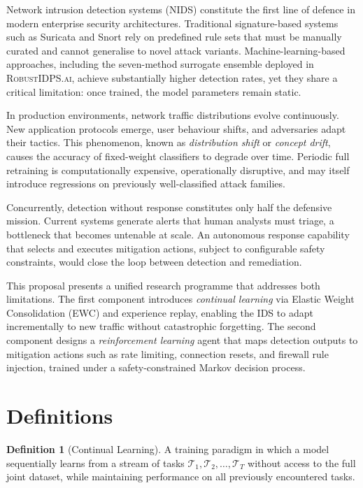 \documentclass[12pt,a4paper]{article}
\newcommand{\RobustIDPS}{\textsc{RobustIDPS.ai}}
\newcommand{\EWC}{\textsc{EWC}}
\theoremstyle{definition}
\newtheorem{definition}{Definition}[section]
\begin{document}
Network intrusion detection systems (NIDS) constitute the first line of defence in modern enterprise security architectures.
Traditional signature-based systems such as Suricata and Snort rely on predefined rule sets that must be manually curated and cannot generalise to novel attack variants.
Machine-learning-based approaches, including the seven-method surrogate ensemble deployed in \RobustIDPS{}, achieve substantially higher detection rates, yet they share a critical limitation: once trained, the model parameters remain static.

In production environments, network traffic distributions evolve continuously.
New application protocols emerge, user behaviour shifts, and adversaries adapt their tactics.
This phenomenon, known as \emph{distribution shift} or \emph{concept drift}, causes the accuracy of fixed-weight classifiers to degrade over time.
Periodic full retraining is computationally expensive, operationally disruptive, and may itself introduce regressions on previously well-classified attack families.

Concurrently, detection without response constitutes only half the defensive mission.
Current systems generate alerts that human analysts must triage, a bottleneck that becomes untenable at scale.
An autonomous response capability that selects and executes mitigation actions, subject to configurable safety constraints, would close the loop between detection and remediation.

This proposal presents a unified research programme that addresses both limitations.
The first component introduces \emph{continual learning} via Elastic Weight Consolidation (\EWC{}) and experience replay, enabling the IDS to adapt incrementally to new traffic without catastrophic forgetting.
The second component designs a \emph{reinforcement learning} agent that maps detection outputs to mitigation actions such as rate limiting, connection resets, and firewall rule injection, trained under a safety-constrained Markov decision process.


\section{Definitions}
\label{sec:definitions}

\begin{definition}[Continual Learning]
A training paradigm in which a model sequentially learns from a stream of tasks $\mathcal{T}_1, \mathcal{T}_2, \ldots, \mathcal{T}_T$ without access to the full joint dataset, while maintaining performance on all previously encountered tasks.
\end{definition}
\end{document}
